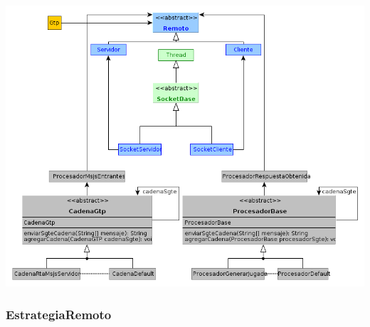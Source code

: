 \documentclass[11pt]{article}
\begin{document}
\begin{center}
 \includegraphics[scale=0.6]{./Diagramas/DiagramaRemoto/diagrama_remoto.png}
 \end{center}

\subsubsection{EstrategiaRemoto}
\label{sec-4.2.1}
\end{document}
